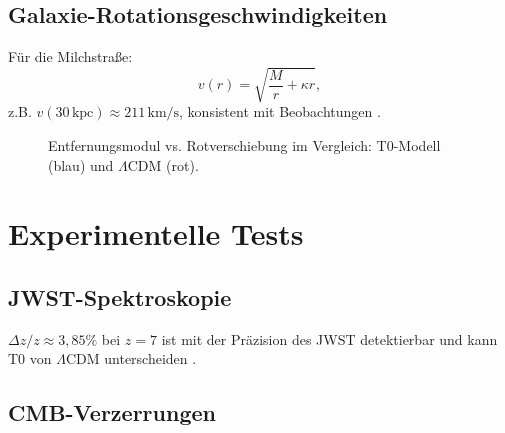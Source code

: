 \documentclass[twocolumn,aps,prl]{revtex4-2}
\newcommand{\LCDM}{\Lambda\text{CDM}}
\begin{document}
	\subsection{Galaxie-Rotationsgeschwindigkeiten}
	\label{subsec:rotation_velocity_prediction}
	
	Für die Milchstraße:
	\begin{equation}
		v(r) = \sqrt{\frac{M}{r} + \kappa r},
		\label{eq:rotation_velocity_repeat}
	\end{equation}
	z.B. \(v(30 \, \text{kpc}) \approx 211 \, \text{km/s}\), konsistent mit Beobachtungen \cite{McGaugh2016}.
	
	\begin{figure}[ht]
		\centering
		\caption{Entfernungsmodul vs. Rotverschiebung im Vergleich: T0-Modell (blau) und \(\LCDM\) (rot).}
		\label{fig:distance_modulus}
	\end{figure}
	
	\section{Experimentelle Tests}
	\label{sec:tests}
	
	\subsection{JWST-Spektroskopie}
	\label{subsec:jwst_test}
	
	\(\Delta z / z \approx 3,85\%\) bei \(z = 7\) ist mit der Präzision des JWST detektierbar und kann T0 von \(\LCDM\) unterscheiden \cite{pascher_params_2025}.
	
	\subsection{CMB-Verzerrungen}
	\label{subsec:cmb_distortions_test}
	
\end{document}
